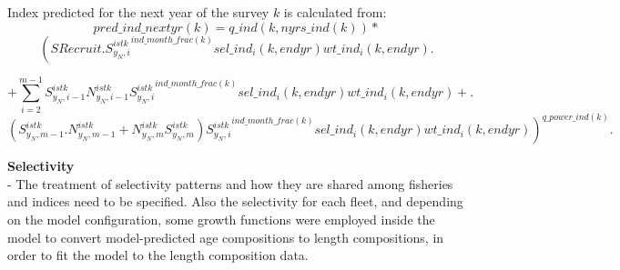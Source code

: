 \documentclass{article}
\begin{document}

Index predicted for the next year of the survey $k$ is calculated from:
\begin{equation}
    pred\_ind\_nextyr(k)=q\_ind(k,nyrs\_ind(k)) * 
\end{equation}
\begin{equation*}
    \left( SRecruit. {S^{istk}_{y_N,i}}^{ind\_month\_frac(k)} sel\_ind_i(k,endyr)  wt\_ind_i(k,endyr).\right.
\end{equation*}

\begin{equation}
+\sum_{i=2}^{m-1}S^{istk}_{y_N,i-1}N^{istk}_{y_N,i-1}{S^{istk}_{y_N,i}}^{ind\_month\_frac(k)} sel\_ind_i(k,endyr)  wt\_ind_i(k,endyr)+.
\end{equation}
\begin{equation*}
  \left. (S^{istk}_{y_N,m-1}.N^{istk}_{y_N,m-1}+N^{istk}_{y_N,m}S^{istk}_{y_N,m}){S^{istk}_{y_N,i}}^{ind\_month\_frac(k)} sel\_ind_i(k,endyr)  wt\_ind_i(k,endyr) \right)^{q\_power\_ind(k)}.
\end{equation*}



\textbf{Selectivity}\\

- The treatment of selectivity patterns and how they are shared among fisheries and indices need to be specified. Also the selectivity for each fleet, and depending on the model configuration, some growth functions were employed inside the model to convert model-predicted age compositions to length compositions, in order to fit the model to the length composition data.\\
\end{document}
